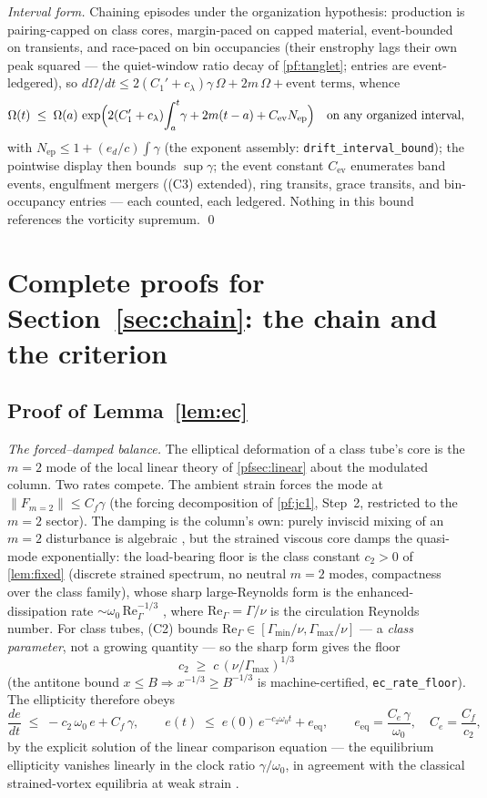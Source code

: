 \documentclass[11pt,letterpaper]{amsart}
\theoremstyle{definition}
\theoremstyle{remark}
\newcommand{\om}{\omega}
\newcommand{\norm}[1]{\lVert #1 \rVert}
\begin{document}
\emph{Interval form.} Chaining episodes under the organization hypothesis:
production is pairing-capped on class cores, margin-paced on capped material,
event-bounded on transients, and race-paced on bin occupancies (their enstrophy
lags their own peak squared --- the quiet-window ratio decay of
\cref{pf:tanglet}; entries are event-ledgered), so
$d\Omega/dt\le2(C_1'+c_\lambda)\gamma\,\Omega+2m\,\Omega+\text{event terms}$,
whence
\[
\Omega(t)\;\le\;\Omega(a)\,
\exp\Bigl(2(C_1'+c_\lambda)\!\int_a^t\!\gamma+2m(t-a)+C_{\mathrm{ev}}N_{\mathrm{ep}}\Bigr)
\quad\text{on any organized interval},
\]
with $N_{\mathrm{ep}}\le1+(e_d/c)\int\gamma$ (the exponent assembly:
\texttt{drift\_interval\_bound}); the pointwise display then bounds
$\sup\gamma$; the event constant $C_{\mathrm{ev}}$ enumerates band events,
engulfment mergers (\textup{(C3)} extended), ring transits, grace transits, and
bin-occupancy entries --- each counted, each ledgered. Nothing in this bound
references the vorticity supremum. \qed


\section{Complete proofs for Section~\ref{sec:chain}: the chain and the criterion}\label{pfsec:chain}

\subsection{Proof of Lemma~\ref{lem:ec}}\label{pf:ec}
\emph{The forced--damped balance.} The elliptical deformation of a class tube's core
is the $m=2$ mode of the local linear theory of \cref{pfsec:linear} about the
modulated column. Two rates compete. The ambient strain forces the mode at
$\norm{F_{m=2}}\le C_f\gamma$ (the forcing decomposition of \cref{pf:jc1}, Step~2,
restricted to the $m=2$ sector). The damping is the column's own: purely inviscid
mixing of an $m=2$ disturbance is algebraic
\cite{BCZV2019,Schecter2000}, but the strained viscous core damps the quasi-mode
exponentially: the load-bearing floor is the class constant $c_2>0$ of
\cref{lem:fixed} (discrete strained spectrum, no neutral $m=2$ modes, compactness
over the class family), whose sharp large-Reynolds form is the enhanced-dissipation
rate $\sim\om_0\,\mathrm{Re}_\Gamma^{-1/3}$ \cite{LiWeiZhang2020,Gallay2018},
where $\mathrm{Re}_\Gamma=\Gamma/\nu$ is the circulation Reynolds number. For class
tubes, (C2) bounds $\mathrm{Re}_\Gamma\in[\Gamma_{\min}/\nu,\Gamma_{\max}/\nu]$ --- a
\emph{class parameter}, not a growing quantity --- so the sharp form gives the floor
\[
c_2\;\ge\;c\,(\nu/\Gamma_{\max})^{1/3}
\]
(the antitone bound $x\le B\Rightarrow x^{-1/3}\ge B^{-1/3}$ is machine-certified,
\texttt{ec\_rate\_floor}). The ellipticity therefore obeys
\[
\frac{de}{dt}\;\le\;-c_2\,\om_0\,e+C_f\,\gamma,
\qquad
e(t)\;\le\;e(0)\,e^{-c_2\om_0t}+e_{\mathrm{eq}},
\qquad
e_{\mathrm{eq}}=\frac{C_e\,\gamma}{\om_0},\quad C_e=\frac{C_f}{c_2},
\]
by the explicit solution of the linear comparison equation --- the equilibrium
ellipticity vanishes linearly in the clock ratio $\gamma/\om_0$, in agreement with
the classical strained-vortex equilibria at weak strain
\cite{MooreSaffman1971,Kida1981}.
\end{document}
